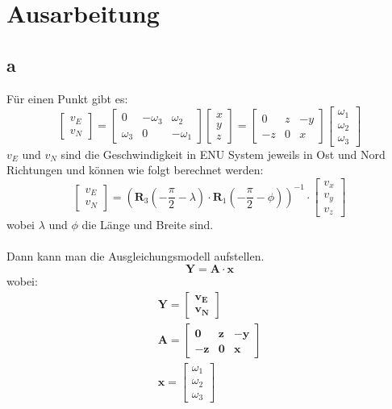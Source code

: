 \chapter{Ausarbeitung}
\section{a}
Für einen Punkt gibt es:
\begin{equation*}
	\begin{bmatrix}
		v_E \\
		v_N
	\end{bmatrix} = \begin{bmatrix}
		0 & -\omega_3 & \omega_2 \\
		\omega_3 & 0 & -\omega_1 
\end{bmatrix} \begin{bmatrix}
	x \\
	y \\
	z
\end{bmatrix} = \begin{bmatrix}
	0 & z & -y \\
	-z & 0 & x 
\end{bmatrix} \begin{bmatrix}
	\omega_1 \\
	\omega_2 \\
	\omega_3
\end{bmatrix}
\end{equation*}
$v_E$ und $v_N$ sind die Geschwindigkeit in ENU System jeweils in Ost und Nord Richtungen und können wie folgt berechnet werden:
\begin{equation*}
	\begin{bmatrix}
		v_E \\
		v_N
	\end{bmatrix} = (\bm{R}_3(-\frac{\pi}{2} - \lambda) \cdot \bm{R}_1(-\frac{\pi}{2} - \phi))^{-1} \cdot \begin{bmatrix}
	v_x \\
	v_y \\
	v_z
\end{bmatrix}
\end{equation*}
wobei $\lambda$ und $\phi$ die Länge und Breite sind.\\\\
Dann kann man die Ausgleichungsmodell aufstellen. 
\begin{equation*}
	\bm{Y} = \bm{A} \cdot \bm{x}
\end{equation*}
wobei:
\begin{gather*}
	\bm{Y} = \begin{bmatrix}
		\bm{v_E} \\
		\bm{v_N}
	\end{bmatrix} \\
	\bm{A} = \begin{bmatrix}
		\bm{0} & \bm{z} & -\bm{y} \\
		-\bm{z} & \bm{0} & \bm{x} 
	\end{bmatrix} \\
	\bm{x} =  \begin{bmatrix}
		\omega_1 \\
		\omega_2 \\
		\omega_3
	\end{bmatrix}
\end{gather*}
